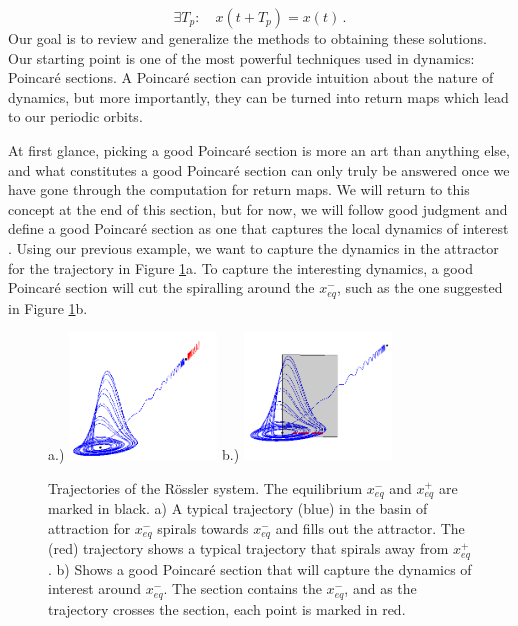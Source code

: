 \documentclass[12 pt]{article}
\begin{document}
\begin{equation}
\exists T_p : \quad  x(t+T_p) = x(t) \,.
  \label{eq:PerTraj}
\end{equation}
Our goal is to review and generalize the methods to obtaining these solutions.  Our starting point is one of the most powerful techniques used in dynamics: Poincar\'e sections.  A Poincar\'e section can provide intuition about the nature of dynamics, but more importantly, they can be turned into return maps which lead to our periodic orbits.

At first glance, picking a good Poincar\'e section is more an art than anything else, and what constitutes a good Poincar\'e section can only truly be answered once we have gone through the computation for return maps.  We will return to this concept at the end of this section, but for now, we will follow good judgment and define a good Poincar\'e section as one that captures the local dynamics of interest \cite{CB}.  Using our previous example, we want to capture the dynamics in the attractor for the trajectory in Figure \ref{fig:RossTraj}a.  To capture the interesting dynamics, a good Poincar\'e section will cut the spiralling around the $x_{eq}^{-}$, such as the one suggested in Figure \ref{fig:RossTraj}b.

 \begin{figure}[h]
\centering
a.)  \includegraphics[width=0.35\textwidth]{Figs/Section1/kcRosslerTrajc.png}
b.)
  \includegraphics[width=0.35\textwidth]{Figs/Section1/kcRosslerTrajwithPSc.png}
\caption{Trajectories of the R\"ossler system.  The equilibrium $x_{eq}^{-}$ and $x_{eq}^{+}$ are marked in black.  a) A typical trajectory (blue) in the basin of attraction for $x_{eq}^{-}$ spirals towards $x_{eq}^{-}$ and fills out the attractor.  The (red) trajectory shows a typical trajectory that spirals away from $x_{eq}^{+}$.  b) Shows a good Poincar\'e section that will capture the dynamics of interest around $x_{eq}^{-}$.  The section contains the $x_{eq}^{-}$, and as the trajectory crosses the section, each point is marked in red.}
 \label{fig:RossTraj}
\end{figure}
\end{document}
